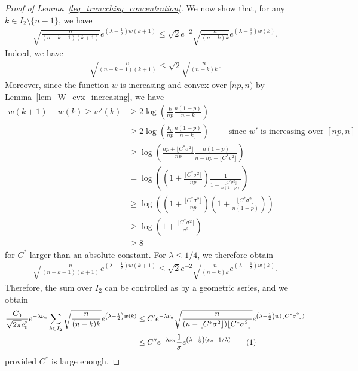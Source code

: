 \documentclass{article}
\newcommand\numberthis{\addtocounter{equation}{1}\tag{\theequation}}
\begin{document}
\begin{proof}[Proof of Lemma~\ref{leq_truncchisq_concentration}]
We now show that, for any $k \in I_2 \setminus \{n-1\}$, we have
\begin{align*}
    \sqrt{\frac{n}{(n-k-1)(k+1)}} e^{\left(\lambda - \frac{1}{2}\right)w(k+1)} \leq \sqrt{2} e^{-2} \sqrt{\frac{n}{(n-k)k}} e^{\left(\lambda - \frac{1}{2}\right)w(k)}.
\end{align*}
Indeed, we have
\begin{align*}
    \sqrt{\frac{n}{(n-k-1)(k+1)}}  \leq \sqrt{2}\sqrt{\frac{n}{(n-k)k}}.  
\end{align*}
Moreover, since the function $w$ is increasing and convex over $[np,n)$ by Lemma~\ref{lem_W_cvx_increasing}, we have 
\begin{align*}
    w(k+1) - w(k)\geq w'(k) &\geq  2 \log\left(\frac{k}{np} \frac{n(1-p)}{n-k}\right)\\
    & \geq 2 \log\left(\frac{k_0}{np} \frac{n(1-p)}{n-k_0}\right) \qquad \text{ since $w'$ is increasing over }[np,n]\\
    & \geq \log\left(\frac{np + \lfloor C^*\sigma^2 \rfloor}{np} \frac{n(1-p)}{n-np - \lfloor C^*\sigma^2 \rfloor}\right)\\
    & = \log\left(\left(1 + \frac{\lfloor C^*\sigma^2 \rfloor}{np} \right)\frac{1}{1 - \frac{\lfloor C^*\sigma^2 \rfloor}{n (1-p)}}\right)\\
    & \geq \log\left(\left(1 + \frac{\lfloor C^*\sigma^2 \rfloor}{np} \right)\left(1 + \frac{\lfloor C^*\sigma^2 \rfloor}{n (1-p)}\right)\right)\\
    & \geq \log \left(1+\frac{\lfloor C^*\sigma^2 \rfloor}{\sigma^2}\right)\\
    & \geq 8
\end{align*}
for $C^*$ larger than an absolute constant. 
For $\lambda \leq 1/4$, we therefore obtain
\begin{align*}
    \sqrt{\frac{n}{(n-k-1)(k+1)}} e^{\left(\lambda - \frac{1}{2}\right)w(k+1)} \leq \sqrt{2} e^{-2} \sqrt{\frac{n}{(n-k)k}} e^{\left(\lambda - \frac{1}{2}\right)w(k)}.
\end{align*}
Therefore, the sum over $I_2$ can be controlled as by a geometric series, and we obtain 
\begin{align*}
    \frac{C_0}{\sqrt{2\pi}c_0^2} e^{-\lambda \nu_a} \sum_{k \in I_2} \sqrt{\frac{n}{(n-k)k}} e^{\left(\lambda - \frac{1}{2}\right)w(k)} & \leq C' e^{-\lambda \nu_a} \sqrt{\frac{n}{(n-\lfloor C^* \sigma^2 \rfloor)\lfloor C^* \sigma^2 \rfloor}} e^{\left(\lambda - \frac{1}{2}\right)w(\lfloor C^* \sigma^2 \rfloor)}\\
    & \leq C'' e^{-\lambda \nu_a} \frac{1}{\sigma} e^{\left(\lambda - \frac{1}{2}\right)\left(\nu_a + 1/\lambda\right)}\numberthis\label{eq_thirn_term_I2}
\end{align*}
provided $C^*$ is large enough. 


\end{proof}
\end{document}
